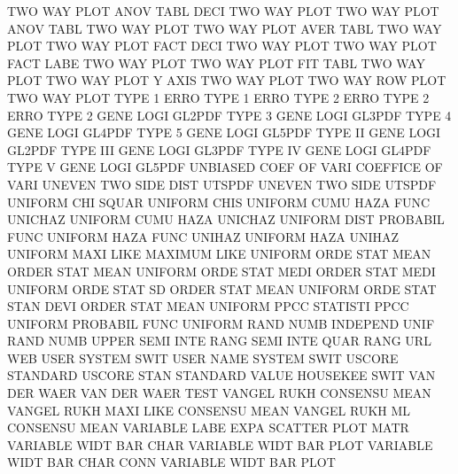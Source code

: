 TWO      WAY  PLOT ANOV TABL DECI       TWO      WAY  PLOT
TWO      WAY  PLOT ANOV TABL            TWO      WAY  PLOT
TWO      WAY  PLOT AVER TABL            TWO      WAY  PLOT
TWO      WAY  PLOT FACT DECI            TWO      WAY  PLOT
TWO      WAY  PLOT FACT LABE            TWO      WAY  PLOT
TWO      WAY  PLOT FIT  TABL            TWO      WAY  PLOT
TWO      WAY  PLOT Y    AXIS            TWO      WAY  PLOT
TWO      WAY  ROW  PLOT                 TWO      WAY  PLOT
TYPE     1    ERRO                      TYPE     1    ERRO
TYPE     2    ERRO                      TYPE     2    ERRO
TYPE     2    GENE LOGI                 GL2PDF
TYPE     3    GENE LOGI                 GL3PDF
TYPE     4    GENE LOGI                 GL4PDF
TYPE     5    GENE LOGI                 GL5PDF
TYPE     II   GENE LOGI                 GL2PDF
TYPE     III  GENE LOGI                 GL3PDF
TYPE     IV   GENE LOGI                 GL4PDF
TYPE     V    GENE LOGI                 GL5PDF
UNBIASED COEF OF   VARI                 COEFFICE OF   VARI
UNEVEN   TWO  SIDE DIST                 UTSPDF
UNEVEN   TWO  SIDE                      UTSPDF
UNIFORM  CHI  SQUAR                     UNIFORM  CHIS
UNIFORM  CUMU HAZA FUNC                 UNICHAZ
UNIFORM  CUMU HAZA                      UNICHAZ
UNIFORM  DIST                           PROBABIL FUNC
UNIFORM  HAZA FUNC                      UNIHAZ
UNIFORM  HAZA                           UNIHAZ
UNIFORM  MAXI LIKE                      MAXIMUM  LIKE
UNIFORM  ORDE STAT MEAN                 ORDER    STAT MEAN
UNIFORM  ORDE STAT MEDI                 ORDER    STAT MEDI
UNIFORM  ORDE STAT SD                   ORDER    STAT MEAN
UNIFORM  ORDE STAT STAN DEVI            ORDER    STAT MEAN
UNIFORM  PPCC                           STATISTI PPCC
UNIFORM                                 PROBABIL FUNC
UNIFORM  RAND NUMB                      INDEPEND UNIF RAND NUMB
UPPER    SEMI INTE RANG                 SEMI     INTE QUAR RANG
URL                                     WEB
USER                                    SYSTEM   SWIT
USER     NAME                           SYSTEM   SWIT
USCORE                                  STANDARD
USCORE   STAN                           STANDARD
VALUE                                   HOUSEKEE SWIT
VAN      DER  WAER                      VAN      DER  WAER TEST
VANGEL   RUKH                           CONSENSU MEAN
VANGEL   RUKH MAXI LIKE                 CONSENSU MEAN
VANGEL   RUKH ML                        CONSENSU MEAN
VARIABLE LABE EXPA                      SCATTER  PLOT MATR
VARIABLE WIDT BAR  CHAR                 VARIABLE WIDT BAR  PLOT
VARIABLE WIDT BAR  CHAR CONN            VARIABLE WIDT BAR  PLOT
